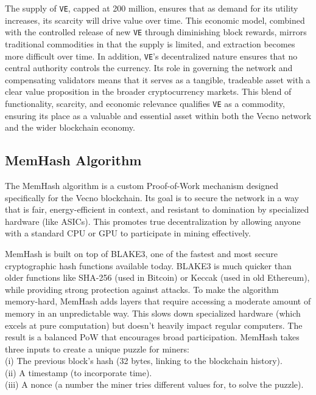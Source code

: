 \documentclass[a4paper,onecolumn,superscriptaddress,10pt]{compositionalityarticle}
\begin{document}
The supply of \texttt{VE}, capped at 200 million, ensures that as demand for its utility increases, its scarcity will drive value over time. This economic model, combined with the controlled release of new \texttt{VE} through diminishing block rewards, mirrors traditional commodities in that the supply is limited, and extraction becomes more difficult over time.
In addition, \texttt{VE}’s decentralized nature ensures that no central authority controls the currency. Its role in governing the network and compensating validators means that it serves as a tangible, tradeable asset with a clear value proposition in the broader cryptocurrency markets. This blend of functionality, scarcity, and economic relevance qualifies \texttt{VE} as a commodity, ensuring its place as a valuable and essential asset within both the Vecno network and the wider blockchain economy.

\subsection{MemHash Algorithm}\label{sec1.2}

The MemHash algorithm is a custom Proof-of-Work mechanism designed specifically for the Vecno blockchain. Its goal is to secure the network in a way that is fair, energy-efficient in context, and resistant to domination by specialized hardware (like ASICs). This promotes true decentralization by allowing anyone with a standard CPU or GPU to participate in mining effectively. 

MemHash is built on top of BLAKE3, one of the fastest and most secure cryptographic hash functions available today. BLAKE3 is much quicker than older functions like SHA-256 (used in Bitcoin) or Keccak (used in old Ethereum), while providing strong protection against attacks.
To make the algorithm memory-hard, MemHash adds layers that require accessing a moderate amount of memory in an unpredictable way. This slows down specialized hardware (which excels at pure computation) but doesn't heavily impact regular computers. The result is a balanced PoW that encourages broad participation.
MemHash takes three inputs to create a unique puzzle for miners: \\ (i) The previous block's hash (32 bytes, linking to the blockchain history). \\ (ii) A timestamp (to incorporate time). \\ (iii) A nonce (a number the miner tries different values for, to solve the puzzle).
\end{document}
